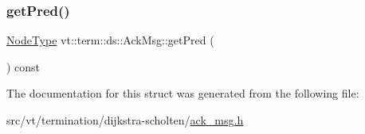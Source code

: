 \mbox{\label{structvt_1_1term_1_1ds_1_1_ack_msg_aee8c447d40b6aebf018a7402527a355e}} 
\subsubsection{\texorpdfstring{get\+Pred()}{getPred()}}
{\footnotesize\ttfamily \hyperlink{namespacevt_a866da9d0efc19c0a1ce79e9e492f47e2}{Node\+Type} vt\+::term\+::ds\+::\+Ack\+Msg\+::get\+Pred (\begin{DoxyParamCaption}{ }\end{DoxyParamCaption}) const\hspace{0.3cm}{\ttfamily [inline]}}



The documentation for this struct was generated from the following file\+:\begin{DoxyCompactItemize}
\item 
src/vt/termination/dijkstra-\/scholten/\hyperlink{ack__msg_8h}{ack\+\_\+msg.\+h}\end{DoxyCompactItemize}
